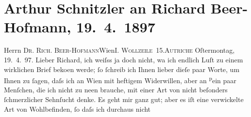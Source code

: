 

         
         \renewcommand{\erwaehntePersonen}{Personen: Richard Beer-Hofmann, Paula Beer-Hofmann, Paul Goldmann, Hugo von Hofmannsthal, Felix Salten, Gustav Schwarzkopf, Leo Van-Jung}
         \renewcommand{\erwaehnteOrte}{Orte: Frankfurt am Main, I., Innere Stadt, Paris, Wien, Wollzeile, rue La Fayette, rue de la Bourse, Österreich}
         \renewcommand{\erwaehnteWerke}{}
               \section[Arthur Schnitzler an Richard Beer-Hofmann, 19. 4. 1897]{ Arthur Schnitzler an Richard Beer-Hofmann, 19. 4. 1897}\nopagebreak{}\rehead{ }\begin{ledgroupsized}[t]{13cm}\normalsize\beginnumbering \toendnotes[C]{\smallbreak\pagebreak[2]} 
\toendnotes[C]{\smallbreak}\pstart{}{\pb}Herrn \textsc{Dr. Rich.
                     Beer-Hofmann}\pend{}\pstart{}Wien\pend{}\pstart{}\textsc{I. Wollzeile 15}.\pend{}\pstart{}\textsc{Autriche}\pend{}{\bigskip}\pstart
           \raggedleft{}{\pb}Oſtermontag, 19. 4. 97.\pend
           \pstart
           Lieber Richard, ich weiſss ja doch nicht, wa{\geminationn} ich endlich Luſt zu einem wirklichen Brief beko{\geminationm}en werde; ſo ſchreib ich Ihnen lieber dieſe paar Worte,
               um Ihnen zu ſagen, daſs ich an Wien mit heftigem
               Widerwillen, aber an \substVorne{}\textsuperscript{p}\substDazwischen{}e\substHinten{}in paar Menſchen, die ich nicht zu ne{\geminationn}en
               brauche, mit einer Art \introOben{}von\introOben{} nicht beſonders {\pb}ſchmerzlicher Sehnſucht denke. Es geht mir ganz gut;
               aber es iſt eine verwickelte Art von Wohlbefinden, ſo daſs ich durchaus nicht

\end{ledgroupsized}
